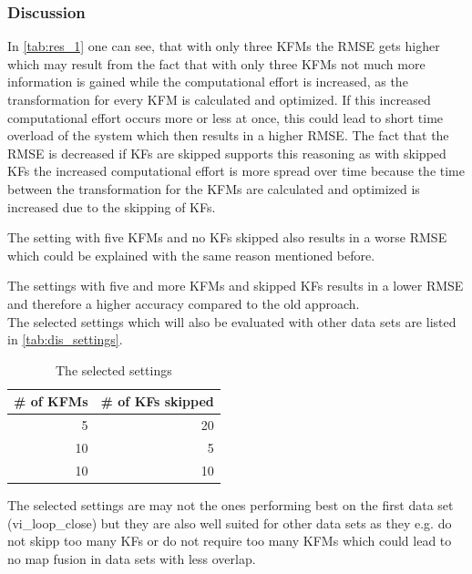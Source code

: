 \subsubsection{Discussion}
In \autoref{tab:res_1} one can see, that with only three \acp{KFM} the \ac{RMSE} gets higher which may result from the fact that with only three \acp{KFM} not much more information is gained while the computational effort is increased, as the transformation for every \ac{KFM} is calculated and optimized. If this increased computational effort occurs more or less at once, this could lead to short time overload of the system which then results in a higher \ac{RMSE}. The fact that the \ac{RMSE} is decreased if \acp{KF} are skipped supports this reasoning as with skipped \acp{KF} the increased computational effort is more spread over time because the time between the transformation for the \acp{KFM} are calculated and optimized is increased due to the skipping of \acp{KF}.

The setting with five \acp{KFM} and no \acp{KF} skipped also results in a worse \ac{RMSE} which could be explained with the same reason mentioned before.

The settings with five and more \acp{KFM} and skipped \acp{KF} results in a lower \ac{RMSE} and therefore a higher accuracy compared to the old approach.\\

The selected settings which will also be evaluated with other data sets are listed in \autoref{tab:dis_settings}.

\begin{table}[ht!]
	\begin{center}
		\begin{tabular}{r|r}
			\# of \acp{KFM} & \# of \acp{KF} skipped  \\ 
			\hline 
			5 & 20 \\ 
			10 & 5 \\ 
			10 & 10 \\ 
		\end{tabular} 
	\end{center}
	\caption{The selected settings}
	\label{tab:dis_settings}
\end{table}

The selected settings are may not the ones performing best on the first data set (vi\_loop\_close) but they are also well suited for other data sets as they e.g. do not skipp too many \acp{KF} or do not require too many \acp{KFM} which could lead to no map fusion in data sets with less overlap.\\

